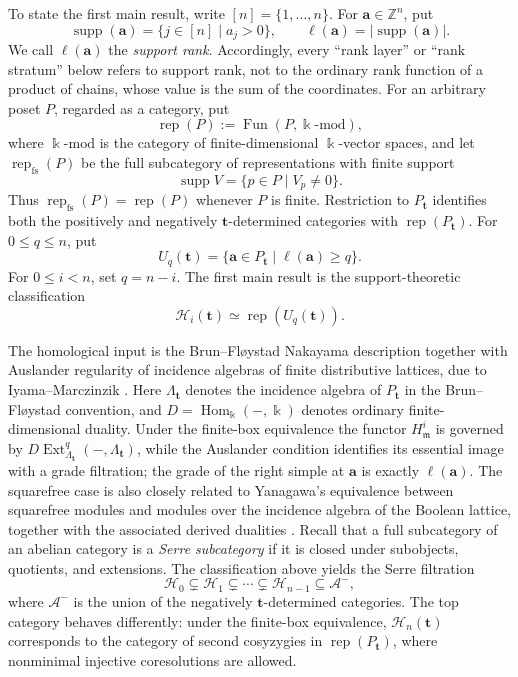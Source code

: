 \documentclass[12pt,reqno]{amsart}
\theoremstyle{definition}
\theoremstyle{remark}
\newcommand{\Rep}{\operatorname{rep}}
\newcommand{\Hom}{\operatorname{Hom}}
\newcommand{\Ext}{\operatorname{Ext}}
\begin{document}
To state the first main result, write $[n]=\{1,\ldots,n\}$.  For
$\mathbf a\in\mathbb Z^n$, put
\[
\operatorname{supp}(\mathbf a)=\{j\in[n]\mid a_j>0\},
\qquad
\ell(\mathbf a)=|\operatorname{supp}(\mathbf a)|.
\]
We call $\ell(\mathbf a)$ the \emph{support rank}.  Accordingly, every
``rank layer'' or ``rank stratum'' below refers to support rank, not to the
ordinary rank function of a product of chains, whose value is the sum of the
coordinates.  For an arbitrary poset $P$, regarded as a category, put
\[
\Rep(P):=\operatorname{Fun}(P,\Bbbk\text{-}\mathrm{mod}),
\]
where $\Bbbk\text{-}\mathrm{mod}$ is the category of finite-dimensional
$\Bbbk$-vector spaces, and let $\Rep_{\mathrm{fs}}(P)$ be the full subcategory
of representations with finite support
\[
\operatorname{supp}V=\{p\in P\mid V_p\ne0\}.
\]
Thus $\Rep_{\mathrm{fs}}(P)=\Rep(P)$ whenever $P$ is finite.  Restriction to
$P_{\mathbf t}$ identifies both the positively and negatively
$\mathbf t$-determined categories with $\Rep(P_{\mathbf t})$.
For $0\le q\le n$, put
\[
U_q(\mathbf t)
=
\{\mathbf a\in P_{\mathbf t}\mid \ell(\mathbf a)\ge q\}.
\]
For $0\le i<n$, set $q=n-i$.  The first main result is the support-theoretic
classification
\begin{equation}\label{eq:intro-classification}
\boxed{
\mathcal H_i(\mathbf t)\simeq\Rep(U_q(\mathbf t)).}
\end{equation}

The homological input is the Brun--Fl\o ystad Nakayama description together
with Auslander regularity of incidence algebras of finite distributive
lattices, due to Iyama--Marczinzik \cite{IM}.  Here
$\Lambda_{\mathbf t}$ denotes the incidence algebra of $P_{\mathbf t}$ in
the Brun--Fl\o ystad convention, and $D=\Hom_\Bbbk(-,\Bbbk)$ denotes ordinary
finite-dimensional duality.  Under the finite-box equivalence the functor
$H^i_{\mathfrak m}$ is governed by
$D\Ext^{q}_{\Lambda_{\mathbf t}}(-,\Lambda_{\mathbf t})$, while the
Auslander condition identifies its essential image with a grade filtration;
the grade of the right simple at $\mathbf a$ is exactly $\ell(\mathbf a)$.
The squarefree case is also closely related to Yanagawa's equivalence between
squarefree modules and modules over the incidence algebra of the Boolean
lattice, together with the associated derived dualities \cite{Yanagawa}.
Recall that a full subcategory of an abelian category is a \emph{Serre
subcategory} if it is closed under subobjects, quotients, and extensions.
The classification above yields the Serre filtration
\[
\mathcal H_0\subsetneq\mathcal H_1\subsetneq\cdots\subsetneq
\mathcal H_{n-1}\subseteq\mathcal A^-,
\]
where $\mathcal A^-$ is the union of the negatively $\mathbf t$-determined
categories.  The top category behaves differently: under the finite-box
equivalence, $\mathcal H_n(\mathbf t)$ corresponds to the category of second
cosyzygies in $\Rep(P_{\mathbf t})$, where nonminimal injective
coresolutions are allowed.
\end{document}
